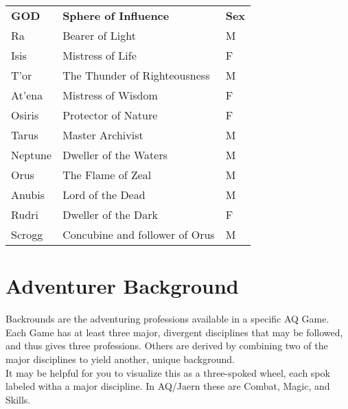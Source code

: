 \begin{multicols*}{2}
\begin{tcolorbox}[breakable,boxrule=0pt,title=\textbf{Patron Gods}]
\begin{tabular}{@{}l l l}
\textbf{GOD} & \textbf{Sphere of Influence} & \textbf{Sex}\\
Ra & Bearer of Light & M\\
Isis & Mistress of Life & F\\
T'or & The Thunder of Righteousness & M\\
At'ena & Mistress of Wisdom & F\\
Osiris & Protector of Nature & F\\
Tarus & Master Archivist & M\\
Neptune & Dweller of the Waters & M\\
Orus & The Flame of Zeal & M\\
Anubis & Lord of the Dead & M\\
Rudri & Dweller of the Dark & F\\
Scrogg & Concubine and follower of Orus & M\\
\end{tabular}
\end{tcolorbox}

\section{Adventurer Background}
Backrounds are the adventuring professions available in a specific AQ Game. Each Game has at least three major, divergent disciplines that may be followed, and thus gives three professions. Others are derived by combining two of the major disciplines to yield another, unique background.\\
It may be helpful for you to visualize this as a three-spoked wheel, each spok labeled witha a major discipline. In AQ/Jaern these are Combat, Magic, and Skills.

\begin{center}


\end{center}
\end{multicols*}
